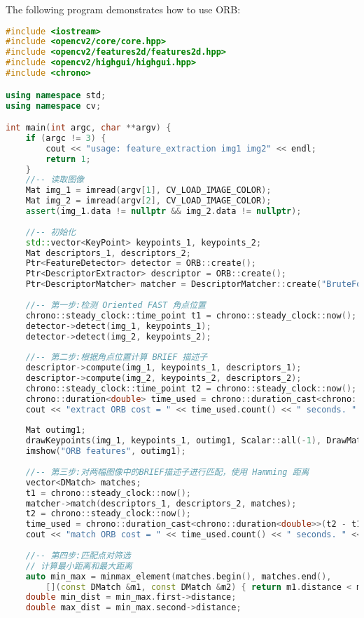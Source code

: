 The following program demonstrates how to use ORB:
\begin{lstlisting}[language=c++,caption=slambook2/ch7/orb_cv.cpp]
#include <iostream>
#include <opencv2/core/core.hpp>
#include <opencv2/features2d/features2d.hpp>
#include <opencv2/highgui/highgui.hpp>
#include <chrono>

using namespace std;
using namespace cv;

int main(int argc, char **argv) {
    if (argc != 3) {
        cout << "usage: feature_extraction img1 img2" << endl;
        return 1;
    }
    //-- 读取图像
    Mat img_1 = imread(argv[1], CV_LOAD_IMAGE_COLOR);
    Mat img_2 = imread(argv[2], CV_LOAD_IMAGE_COLOR);
    assert(img_1.data != nullptr && img_2.data != nullptr);
    
    //-- 初始化
    std::vector<KeyPoint> keypoints_1, keypoints_2;
    Mat descriptors_1, descriptors_2;
    Ptr<FeatureDetector> detector = ORB::create();
    Ptr<DescriptorExtractor> descriptor = ORB::create();
    Ptr<DescriptorMatcher> matcher = DescriptorMatcher::create("BruteForce-Hamming");
    
    //-- 第一步:检测 Oriented FAST 角点位置
    chrono::steady_clock::time_point t1 = chrono::steady_clock::now();
    detector->detect(img_1, keypoints_1);
    detector->detect(img_2, keypoints_2);
    
    //-- 第二步:根据角点位置计算 BRIEF 描述子
    descriptor->compute(img_1, keypoints_1, descriptors_1);
    descriptor->compute(img_2, keypoints_2, descriptors_2);
    chrono::steady_clock::time_point t2 = chrono::steady_clock::now();
    chrono::duration<double> time_used = chrono::duration_cast<chrono::duration<double>>(t2 - t1);
    cout << "extract ORB cost = " << time_used.count() << " seconds. " << endl;
    
    Mat outimg1;
    drawKeypoints(img_1, keypoints_1, outimg1, Scalar::all(-1), DrawMatchesFlags::DEFAULT);
    imshow("ORB features", outimg1);
    
    //-- 第三步:对两幅图像中的BRIEF描述子进行匹配，使用 Hamming 距离
    vector<DMatch> matches;
    t1 = chrono::steady_clock::now();
    matcher->match(descriptors_1, descriptors_2, matches);
    t2 = chrono::steady_clock::now();
    time_used = chrono::duration_cast<chrono::duration<double>>(t2 - t1);
    cout << "match ORB cost = " << time_used.count() << " seconds. " << endl;
    
    //-- 第四步:匹配点对筛选
    // 计算最小距离和最大距离
    auto min_max = minmax_element(matches.begin(), matches.end(),
        [](const DMatch &m1, const DMatch &m2) { return m1.distance < m2.distance; });
    double min_dist = min_max.first->distance;
    double max_dist = min_max.second->distance;
    

\end{lstlisting}
